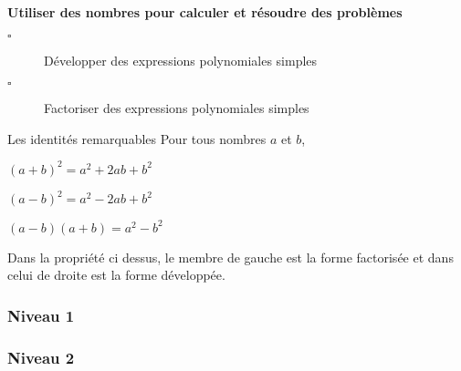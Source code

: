 \documentclass[openany]{book}
\begin{document}
\begin{titre}


\end{titre}


\begin{CpsCol}
\textbf{Utiliser des nombres pour calculer et résoudre des problèmes}
\begin{description}
\item[$\square$] Développer des expressions polynomiales simples
\item[$\square$] Factoriser des expressions polynomiales simples
\end{description}
\end{CpsCol}


\begin{ThT}{Les identités remarquables}
Pour tous nombres $a$ et $b$, 
\begin{description}
\item $(a+b)^2=a^2+2ab+b^2$
\item $(a-b)^2=a^2-2ab+b^2$
\item $(a-b)(a+b)=a^2-b^2$
\end{description}
\end{ThT}


\begin{Rq}
Dans la propriété ci dessus, le membre de gauche est la forme factorisée et dans celui de droite est la forme développée.
\end{Rq}


\subsubsection{Niveau 1}




\begin{minipage}{0.49\linewidth}

\end{minipage}
\hfill
\begin{minipage}{0.49\linewidth}
\end{minipage}
\subsubsection{Niveau 2}
\begin{minipage}{0.49\linewidth}



\end{minipage}
\hfill
\begin{minipage}{0.49\linewidth}



\end{minipage}
\end{document}
